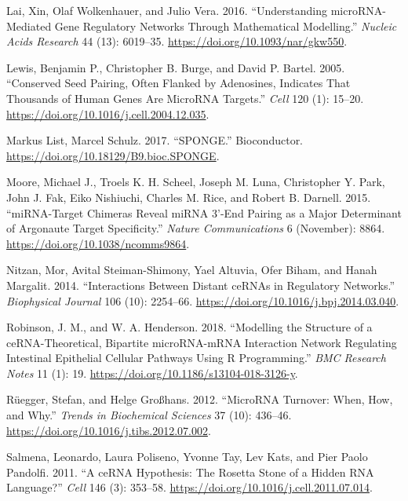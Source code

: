 \documentclass[]{article}
\begin{document}
\leavevmode\hypertarget{ref-lai_understanding_2016}{}%
Lai, Xin, Olaf Wolkenhauer, and Julio Vera. 2016. ``Understanding
microRNA-Mediated Gene Regulatory Networks Through Mathematical
Modelling.'' \emph{Nucleic Acids Research} 44 (13): 6019--35.
\url{https://doi.org/10.1093/nar/gkw550}.

\leavevmode\hypertarget{ref-lewis_conserved_2005}{}%
Lewis, Benjamin P., Christopher B. Burge, and David P. Bartel. 2005.
``Conserved Seed Pairing, Often Flanked by Adenosines, Indicates That
Thousands of Human Genes Are MicroRNA Targets.'' \emph{Cell} 120 (1):
15--20. \url{https://doi.org/10.1016/j.cell.2004.12.035}.

\leavevmode\hypertarget{ref-markus_list_sponge_2017}{}%
Markus List, Marcel Schulz. 2017. ``SPONGE.'' Bioconductor.
\url{https://doi.org/10.18129/B9.bioc.SPONGE}.

\leavevmode\hypertarget{ref-moore_mirnatarget_2015}{}%
Moore, Michael J., Troels K. H. Scheel, Joseph M. Luna, Christopher Y.
Park, John J. Fak, Eiko Nishiuchi, Charles M. Rice, and Robert B.
Darnell. 2015. ``miRNA-Target Chimeras Reveal miRNA 3'-End Pairing as a
Major Determinant of Argonaute Target Specificity.'' \emph{Nature
Communications} 6 (November): 8864.
\url{https://doi.org/10.1038/ncomms9864}.

\leavevmode\hypertarget{ref-nitzan_interactions_2014}{}%
Nitzan, Mor, Avital Steiman-Shimony, Yael Altuvia, Ofer Biham, and Hanah
Margalit. 2014. ``Interactions Between Distant ceRNAs in Regulatory
Networks.'' \emph{Biophysical Journal} 106 (10): 2254--66.
\url{https://doi.org/10.1016/j.bpj.2014.03.040}.

\leavevmode\hypertarget{ref-robinson_modelling_2018}{}%
Robinson, J. M., and W. A. Henderson. 2018. ``Modelling the Structure of
a ceRNA-Theoretical, Bipartite microRNA-mRNA Interaction Network
Regulating Intestinal Epithelial Cellular Pathways Using R
Programming.'' \emph{BMC Research Notes} 11 (1): 19.
\url{https://doi.org/10.1186/s13104-018-3126-y}.

\leavevmode\hypertarget{ref-ruegger_microrna_2012}{}%
Rüegger, Stefan, and Helge Großhans. 2012. ``MicroRNA Turnover: When,
How, and Why.'' \emph{Trends in Biochemical Sciences} 37 (10): 436--46.
\url{https://doi.org/10.1016/j.tibs.2012.07.002}.

\leavevmode\hypertarget{ref-salmena_cerna_2011}{}%
Salmena, Leonardo, Laura Poliseno, Yvonne Tay, Lev Kats, and Pier Paolo
Pandolfi. 2011. ``A ceRNA Hypothesis: The Rosetta Stone of a Hidden RNA
Language?'' \emph{Cell} 146 (3): 353--58.
\url{https://doi.org/10.1016/j.cell.2011.07.014}.
\end{document}
